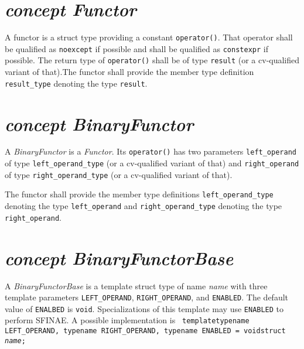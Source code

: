 \section{\textit{concept Functor}}
A functor is a struct type providing a constant  \texttt{operator()}.
That operator shall be qualified as \texttt{noexcept}     if possible
and shall be qualified as \texttt{constexpr} if possible.  The return
type of \texttt{operator()} shall be of type \texttt{result}    (or a
cv-qualified variant of that).\newline\noindent{}The functor    shall
provide the member type definition \texttt{result\_type} denoting the
type \texttt{result}.

\section{\textit{concept BinaryFunctor}}
A \textit{BinaryFunctor} is a \textit{Functor}.
Its \texttt{operator()} has two parameters \texttt{left\_operand} of type
\texttt{left\_operand\_type} (or a cv-qualified variant of that)      and 
\texttt{right\_operand} of type \texttt{right\_operand\_type} (or       a
cv-qualified variant of that).\newline

\noindent{}The functor shall provide the member type              definitions
\texttt{left\_operand\_type}  denoting the type \texttt{left\_operand}    and
\texttt{right\_operand\_type} denoting the type      \texttt{right\_operand}.
\newline

\section{\textit{concept BinaryFunctorBase}}
A  \textit{BinaryFunctorBase} is a template struct type of   name \textit{name}
with three template parameters \texttt{LEFT\_OPERAND}, \texttt{RIGHT\_OPERAND},
and \texttt{ENABLED}. The default value of \texttt{ENALBED} is   \texttt{void}.
Specializations of this template may use \texttt{ENABLED} to    perform SFINAE.
A possible implementation is
\texttt{\newline
\noindent{}template\textlangle typename LEFT\_OPERAND, typename RIGHT\_OPERAND,
typename ENABLED = void\textrangle\newline\noindent{}struct \textit{name};    }
\newline


